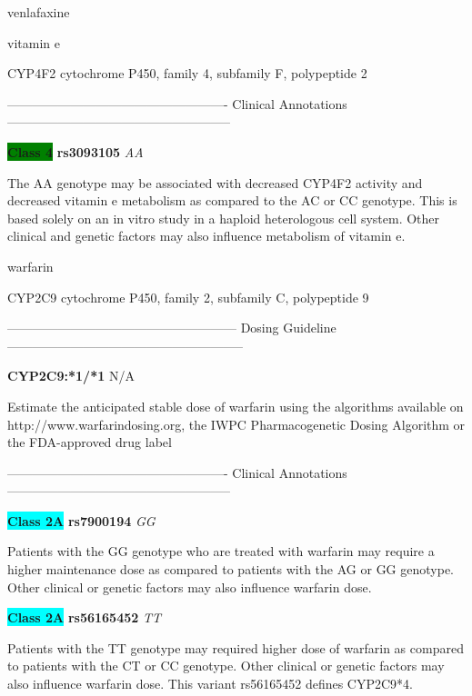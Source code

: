 \documentclass{resume} %
\begin{document}
\begin{rSection}{ venlafaxine }
\end{rSection}\begin{rSection}{ vitamin e }
\item[]

\begin{rSubsection}{ CYP4F2 }{ cytochrome P450, family 4, subfamily F, polypeptide 2 }{}{}
\item[]

\item[] ---------------------------------------------------- Clinical Annotations -----------------------------------------------------\newline
\item \textbf{\colorbox{green} {Class 4}} \textbf{ rs3093105 } \textit{ AA }
\item[] The AA genotype may be associated with decreased CYP4F2 activity and decreased vitamin e metabolism as compared to the AC or CC genotype. This is based solely on an in vitro study in a haploid heterologous cell system. Other clinical and genetic factors may also influence metabolism of vitamin e.
\end{rSubsection}

\end{rSection}\begin{rSection}{ warfarin }
\item[]

\begin{rSubsection}{ CYP2C9 }{ cytochrome P450, family 2, subfamily C, polypeptide 9 }{}{}
\item[]
\item[] ------------------------------------------------------ Dosing Guideline --------------------------------------------------------\newline
\item[] \textbf{ CYP2C9:*1/*1 } N/A

\item[] Estimate the anticipated stable dose of warfarin using the algorithms available on http://www.warfarindosing.org, the IWPC Pharmacogenetic Dosing Algorithm or the FDA-approved drug label
\item[] ---------------------------------------------------- Clinical Annotations -----------------------------------------------------\newline
\item \textbf{\colorbox{cyan} {Class 2A}} \textbf{ rs7900194 } \textit{ GG }
\item[] Patients with the GG genotype who are treated with warfarin may require a higher maintenance dose as compared to patients with the AG or GG genotype.  Other clinical or genetic factors may also influence warfarin dose.\item \textbf{\colorbox{cyan} {Class 2A}} \textbf{ rs56165452 } \textit{ TT }
\item[] Patients with the TT genotype may required higher dose of warfarin as compared to patients with the CT or CC genotype. Other clinical or genetic factors may also influence  warfarin dose. This variant rs56165452 defines CYP2C9*4.
\end{rSubsection}

\end{rSection}
\end{document}

